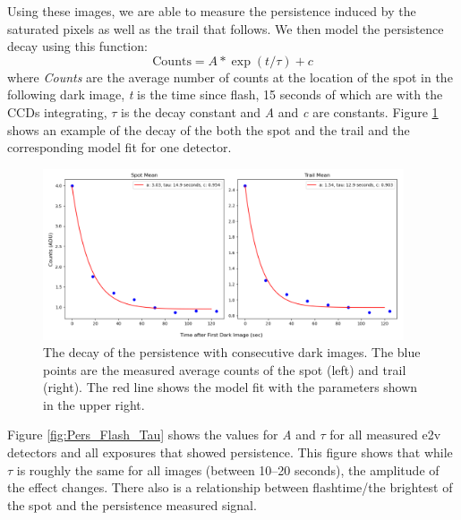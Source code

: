\documentclass[DM,authoryear,toc]{lsstdoc}
\begin{document}
Using these images, we are able to measure the persistence induced by the saturated pixels as well as the trail that follows.
We then model the persistence decay using this function:
\begin{equation*}
  \textrm{Counts}= A * \exp(t/\tau)+c
\end{equation*}
where \textit{Counts} are the average number of counts at the location of the spot in the following dark image, \textit{t} is the time since flash, 15 seconds of which are with the CCDs integrating, \textit{$\tau$} is the decay constant and \textit{A} and \textit{c} are constants.
Figure \ref{fig:Run6_decay} shows an example of the decay of the both the spot and the trail and the corresponding model fit for one detector.

\begin{figure}[!ht]
  \centering
  \includegraphics[width=0.95\textwidth, angle=0]{Run6_decay_2.png}
  \caption{
  The decay of the persistence with consecutive dark images. 
  The blue points are the measured average counts of the spot (left) and trail (right).
  The red line shows the model fit with the parameters shown in the upper right.
  }\label{fig:Run6_decay}
\end{figure}

Figure \ref{fig:Pers_Flash_Tau} shows the values for \textit{A} and \textit{$\tau$} for all measured e2v detectors and all exposures that showed persistence. 
This figure shows that while \textit{$\tau$} is roughly the same for all images (between 10--20 seconds), the amplitude of the effect changes.
There also is a relationship between flashtime/the brightest of the spot and the persistence measured signal.
\end{document}
